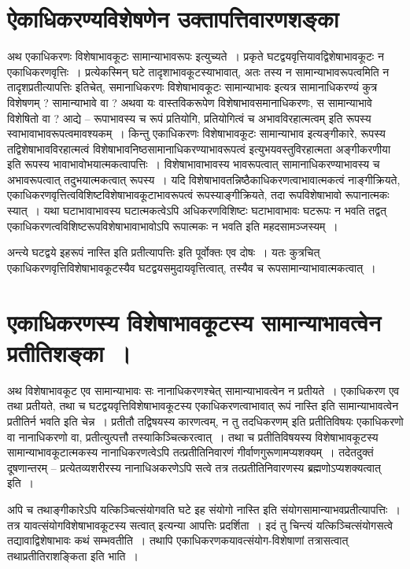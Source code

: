 {\section*{ऐकाधिकरण्यविशेषणेन उक्तापत्तिवारणशङ्का} 

अथ एकाधिकरणः विशेषाभावकूटः सामान्याभावरूपः इत्युच्यते~। प्रकृते घटद्वयवृत्तियावद्विशेषाभावकूटः न एकाधिकरणवृत्तिः~। प्रत्येकस्मिन् घटे तादृशाभावकूटस्याभावात्, अतः तस्य न सामान्याभावरूपत्वमिति न तादृशप्रतीत्यापत्तिः इतिचेत्, समानाधिकरणः विशेषाभावकूटः सामान्याभावः इत्यत्र सामानाधिकरण्यं कुत्र विशेषणम् ? सामान्याभावे वा ? अथवा यः वास्तविकरूपेण विशेषाभावसमानाधिकरणः, स सामान्याभावे विशेषितो वा ? आद्ये – रूपाभावस्य च रूपं प्रतियोगि, प्रतियोगित्वं च अभावविरहात्मत्वम् इति रूपस्य स्वाभावाभावरूपत्वमावश्यकम्~। किन्तु एकाधिकरणः विशेषाभावकूटः सामान्याभाव इत्यङ्गीकारे, रूपस्य तद्विशेषाभावविरहात्मत्वं विशेषाभावनिष्ठसामानाधिकरण्याभावरूपत्वं इत्युभयवस्तुविरहात्मता अङ्गीकरणीया इति रूपस्य  भावाभावोभयात्मकत्वापत्तिः~। विशेषाभावाभावस्य भावरूपत्वात् सामानाधिकरण्याभावस्य च अभावरूपत्वात् तदुभयात्मकत्वात् रूपस्य~। यदि विशेषाभावतन्निष्ठैकाधिकरणत्वाभावात्मकत्वं नाङ्गीक्रियते, एकाधिकरणवृत्तित्वविशिष्टविशेषाभावकूटाभावरूपत्वं रूपस्याङ्गीक्रियते, तदा रूपविशेषाभावो रूपानात्मकः स्यात्~। यथा घटाभावाभावस्य घटात्मकत्वेऽपि अधिकरणविशिष्टः घटाभावाभावः घटरूपः न भवति तद्वत् एकाधिकरणत्वविशिष्टरूपविशेषाभावाभावोऽपि रूपात्मकः न भवति इति महदसामञ्जस्यम्~। 

अन्त्ये घटद्वये इहरूपं नास्ति इति प्रतीत्यापत्तिः इति पूर्वोक्तः एव दोषः~। यतः कुत्रचित् एकाधिकरणवृत्तिविशेषाभावकूटस्यैव घटद्वयसमुदायवृत्तित्वात्, तस्यैव च रूपसामान्याभावात्मकत्वात्~। 

\section*{एकाधिकरणस्य विशेषाभावकूटस्य सामान्याभावत्वेन प्रतीतिशङ्का~। }

अथ विशेषाभावकूट एव सामान्याभावः सः नानाधिकरणश्चेत् सामान्याभावत्वेन न प्रतीयते~। एकाधिकरण एव तथा प्रतीयते, तथा च घटद्वयवृत्तिविशेषाभावकूटस्य एकाधिकरणत्वाभावात् रूपं नास्ति इति सामान्याभावत्वेन प्रतीतिर्न भवति इति चेन्न~। प्रतीतौ तद्विषयस्य कारणत्वम्, न तु तदधिकरणम् इति प्रतीतिविषयः एकाधिकरणो वा नानाधिकरणो वा, प्रतीत्युत्पत्तौ तस्याकिञ्चित्करत्वात्~। तथा च प्रतीतिविषयस्य विशेषाभावकूटस्य सामान्याभावकूटात्मकस्य नानाधिकरणत्वेऽपि तत्प्रतीतिनिवारणं गीर्वाणगुरूणामप्यशक्यम्~। तदेतदुक्तं दूषणान्तरम् – प्रत्येतव्यशरीरस्य नानाधिअकरणेऽपि सत्वे तत्र तत्प्रतीतिनिवारणस्य ब्रह्मणोऽप्यशक्यत्वात्  इति~। 

अपि च तथाङ्गीकारेऽपि यत्किञ्चित्संयोगवति घटे इह संयोगो नास्ति इति संयोगसामान्याभवप्रतीत्यापत्तिः~। तत्र यावत्संयोगविशेषाभावकूटस्य सत्वात् इत्यन्या आपत्तिः प्रदर्शिता~। इदं तु चिन्त्यं यत्किञ्चित्संयोगसत्वे तद्यावाद्विशेषाभावः कथं सम्भवतीति~। तथापि एकाधिकरणकयावत्संयोग-विशेषाणां तत्रासत्वात् तथाप्रतीतिराशङ्किता इति भाति~। 

}

